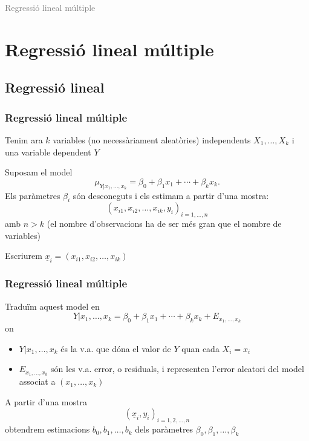 \documentclass[12pt,t]{beamer}
\title[\red{Matemàtiques III}]{}
\author[]{}
\date{}
\newcommand{\gray}[1]{\textcolor{gray}{#1}}
\theoremstyle{plain}
\theoremstyle{definition}
\begin{document}
\beamertemplatedotitem

\lstset{breaklines=true}
\lstset{basicstyle=\ttfamily}


\begin{frame}
\vfill
\begin{center}
\gray{\LARGE Regressió lineal múltiple}
\end{center}
\vfill
\end{frame}


\section{Regressió lineal múltiple}
\subsection{Regressió lineal}

\begin{frame}
\frametitle{Regressió lineal múltiple}

Tenim ara $k$ variables (no necessàriament aleatòries) independents $X_1,\ldots, X_k$ i una
variable dependent $Y$
\medskip

Suposam el model
$$
\mu_{Y|x_1,\ldots,x_k}= \beta_0+\beta_1 x_1+\cdots+\beta_k x_k.
$$
Els paràmetres $\beta_i$ són desconeguts i els estimam  a partir d'una mostra:
$$
(x_{i1},x_{i2},\ldots,x_{ik},y_i)_{i=1,\ldots,n}
$$
amb $n>k$ (el nombre d'observacions ha de ser més gran que el nombre de variables)
\medskip

Escriurem $\underline{x}_i=(x_{i1},x_{i2},\ldots,x_{ik})$
\end{frame}

\begin{frame}
\frametitle{Regressió lineal múltiple}
\vspace*{-2ex}

Traduïm aquest model en
$$
Y|x_1,\ldots,x_k=\beta_0+\beta_1 x_{1}+\cdots+\beta_{k} x_k+E_{x_1,\ldots,x_k}
$$
on
\begin{itemize}
\item $Y|x_1,\ldots,x_k$ és la v.a. que dóna el valor de $Y$ quan cada $X_i=x_i$
\medskip

\item $E_{x_1,\ldots,x_k}$ són les v.a. error, o residuals, i representen l'error aleatori del model associat a
$(x_1,\ldots,x_k)$
\end{itemize}

A partir d'una mostra
$$
(\underline{x}_{i},y_i)_{i=1,2,\ldots,n}
$$
obtendrem estimacions $b_0,b_1,\ldots,b_k$ dels paràmetres $\beta_0,\beta_1,\ldots,\beta_k$
\end{frame}
\end{document}
